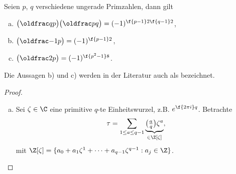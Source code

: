 \begin{st} \label{2.15}
	Seien $p$, $q$ verschiedene ungerade Primzahlen, dann gilt
	\begin{enumerate}[a)]
		\item
			$\legsym qp \legsym pq = (-1)^{\f {p-1}2 \f{q-1}2}$,
		\item
			$\legsym {-1}p = (-1)^{\f {p-1}2}$,
		\item
			$\legsym 2p = (-1)^{\f{p^2 -1}8}$.
	\end{enumerate}
	Die Aussagen b) und c) werden in der Literatur auch als  bezeichnet.
	\begin{proof}
		\begin{enumerate}[a)]
			\item
				Sei $\zeta \in \C$ eine primitive $q$-te Einheitswurzel, z.B. $e^{\f{2\pi i}q}$.
				Betrachte
				\[
					\tau = \sum_{1 \le a \le q-1} \underbrace{\legsym aq \zeta^a}_{\in \Z[\zeta]},
				\]
				mit $\Z[\zeta] = \{ a_0 + a_1 \zeta^1 + \dotsb + a_{q-1} \zeta^{q-1} : a_j \in \Z\}$.


\end{enumerate}
\end{proof}
\end{st}
